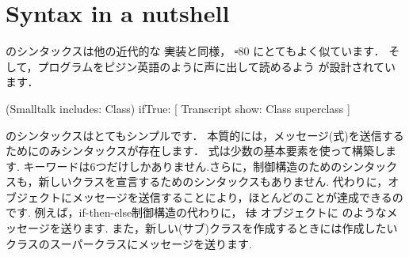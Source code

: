 \documentclass[a4paper,10pt,twoside]{book}
\begin{document}
	\renewcommand{\nnbb}[2]{} %
	\sloppy
\fi
\chapter{Syntax in a nutshell}



\pharo のシンタックスは他の近代的な \st 実装と同様， \st-80 にとてもよく似ています．
そして，プログラムをピジン英語のように声に出して読めるよう  が設計されています．

\begin{code}{}
(Smalltalk includes: Class) ifTrue: [ Transcript show: Class superclass ]
\end{code}

\noindent
\pharo のシンタックスはとてもシンプルです．
本質的には，メッセージ(\ie 式)を送信するためにのみシンタックスが存在します．
式は少数の基本要素を使って構築します.
キーワードは6つだけしかありません.さらに，制御構造のためのシンタックスも，新しいクラスを宣言するためのシンタックスもありません.
代わりに，オブジェクトにメッセージを送信することにより，ほとんどのことが達成できるのです.
例えば，if-then-else制御構造の代わりに， \st は  オブジェクトに  のようなメッセージを送ります.
また，新しい(サブ)クラスを作成するときには作成したいクラスのスーパークラスにメッセージを送ります.
\end{document}
